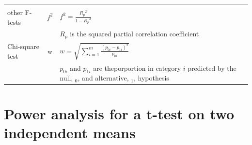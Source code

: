 \documentclass[
  12pt,
]{book}
\begin{document}
\begin{longtable}[]{@{}lcl@{}}
\begin{minipage}[t]{0.46\columnwidth}
\end{minipage}\tabularnewline
\begin{minipage}[t]{0.11\columnwidth}\raggedright
other F-tests\strut
\end{minipage} & \begin{minipage}[t]{0.35\columnwidth}\centering
\(f^2\)\strut
\end{minipage} & \begin{minipage}[t]{0.46\columnwidth}\raggedright
\(f^2 = \frac{{R_p}^2}{1-{R_p}^2}\)\strut
\end{minipage}\tabularnewline
\begin{minipage}[t]{0.11\columnwidth}\raggedright
\strut
\end{minipage} & \begin{minipage}[t]{0.35\columnwidth}\centering
\strut
\end{minipage} & \begin{minipage}[t]{0.46\columnwidth}\raggedright
\({R_p}\) is the squared partial correlation coefficient\strut
\end{minipage}\tabularnewline
\begin{minipage}[t]{0.11\columnwidth}\raggedright
Chi-square test\strut
\end{minipage} & \begin{minipage}[t]{0.35\columnwidth}\centering
w\strut
\end{minipage} & \begin{minipage}[t]{0.46\columnwidth}\raggedright
\(w = \sqrt{ \sum_{i=1}^m \frac{(p_{0i} - p_{1i})^2 }{ p_{0i}} }\)\strut
\end{minipage}\tabularnewline
\begin{minipage}[t]{0.11\columnwidth}\raggedright
\strut
\end{minipage} & \begin{minipage}[t]{0.35\columnwidth}\centering
\strut
\end{minipage} & \begin{minipage}[t]{0.46\columnwidth}\raggedright
\(p_{0i}\) and \(p_{1i}\) are theporportion in category \(i\) predicted by the null, \(_0\), and alternative, \(_1\), hypothesis\strut
\end{minipage}\tabularnewline
\bottomrule
\end{longtable}

\hypertarget{power-analysis-for-a-t-test-on-two-independent-means}{%
\section{Power analysis for a t-test on two independent means}\label{power-analysis-for-a-t-test-on-two-independent-means}}
\end{document}
